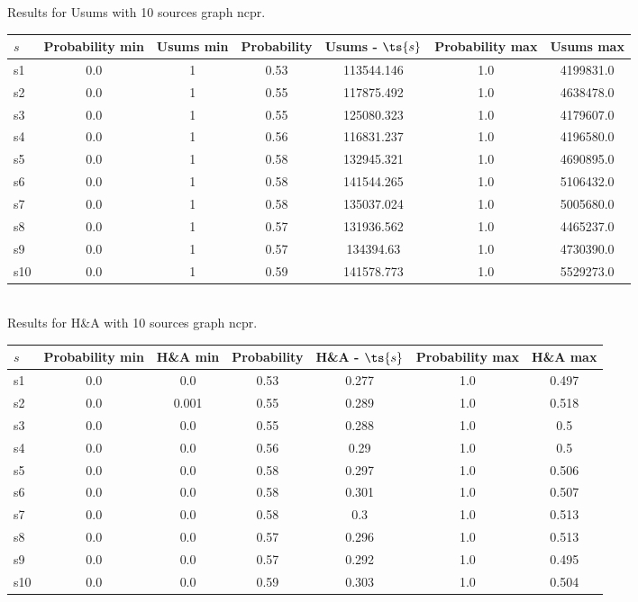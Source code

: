 \documentclass{article}
\begin{document}
\noindent Results for Usums with 10 sources graph ncpr.

\noindent\begin{tabular}{|l|c|c|c|c|c|c|}
\hline
$s$& Probability min & Usums min & Probability & Usums - $\ts{s}$ & Probability max & Usums max\\
\hline
s1 &0.0 & 1 & 0.53 & 113544.146 & 1.0 & 4199831.0\\
\hline
s2 &0.0 & 1 & 0.55 & 117875.492 & 1.0 & 4638478.0\\
\hline
s3 &0.0 & 1 & 0.55 & 125080.323 & 1.0 & 4179607.0\\
\hline
s4 &0.0 & 1 & 0.56 & 116831.237 & 1.0 & 4196580.0\\
\hline
s5 &0.0 & 1 & 0.58 & 132945.321 & 1.0 & 4690895.0\\
\hline
s6 &0.0 & 1 & 0.58 & 141544.265 & 1.0 & 5106432.0\\
\hline
s7 &0.0 & 1 & 0.58 & 135037.024 & 1.0 & 5005680.0\\
\hline
s8 &0.0 & 1 & 0.57 & 131936.562 & 1.0 & 4465237.0\\
\hline
s9 &0.0 & 1 & 0.57 & 134394.63 & 1.0 & 4730390.0\\
\hline
s10 &0.0 & 1 & 0.59 & 141578.773 & 1.0 & 5529273.0\\
\hline
\end{tabular}\\

\noindent Results for H\&A with 10 sources graph ncpr.

\noindent\begin{tabular}{|l|c|c|c|c|c|c|}
\hline
$s$& Probability min & H\&A min & Probability & H\&A - $\ts{s}$ & Probability max & H\&A max\\
\hline
s1 &0.0 & 0.0 & 0.53 & 0.277 & 1.0 & 0.497\\
\hline
s2 &0.0 & 0.001 & 0.55 & 0.289 & 1.0 & 0.518\\
\hline
s3 &0.0 & 0.0 & 0.55 & 0.288 & 1.0 & 0.5\\
\hline
s4 &0.0 & 0.0 & 0.56 & 0.29 & 1.0 & 0.5\\
\hline
s5 &0.0 & 0.0 & 0.58 & 0.297 & 1.0 & 0.506\\
\hline
s6 &0.0 & 0.0 & 0.58 & 0.301 & 1.0 & 0.507\\
\hline
s7 &0.0 & 0.0 & 0.58 & 0.3 & 1.0 & 0.513\\
\hline
s8 &0.0 & 0.0 & 0.57 & 0.296 & 1.0 & 0.513\\
\hline
s9 &0.0 & 0.0 & 0.57 & 0.292 & 1.0 & 0.495\\
\hline
s10 &0.0 & 0.0 & 0.59 & 0.303 & 1.0 & 0.504\\
\hline
\end{tabular}\\
\end{document}
